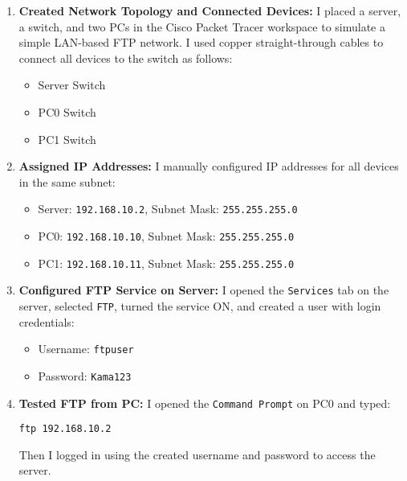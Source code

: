 \documentclass[11pt,a4paper]{article}
\let\oldincludegraphics\includegraphics
\renewcommand{\includegraphics}[2][]{%
  \begin{center}
    \oldincludegraphics[#1]{#2}
  \end{center}
}
\begin{document}
\begin{enumerate}
\item \textbf{Created Network Topology and Connected Devices:} I placed a server, a switch, and two PCs in the Cisco Packet Tracer workspace to simulate a simple LAN-based FTP network. I used copper straight-through cables to connect all devices to the switch as follows:
\begin{itemize}
  \item Server \textrightarrow{} Switch 
  \item PC0 \textrightarrow{} Switch  
  \item PC1 \textrightarrow{} Switch
\end{itemize}


\item \textbf{Assigned IP Addresses:} I manually configured IP addresses for all devices in the same subnet:
\begin{itemize}
  \item Server: \texttt{192.168.10.2}, Subnet Mask: \texttt{255.255.255.0}
  \item PC0: \texttt{192.168.10.10}, Subnet Mask: \texttt{255.255.255.0}
  \item PC1: \texttt{192.168.10.11}, Subnet Mask: \texttt{255.255.255.0}
\end{itemize}


\item \textbf{Configured FTP Service on Server:} I opened the \texttt{Services} tab on the server, selected \texttt{FTP}, turned the service ON, and created a user with login credentials:
\begin{itemize}
  \item Username: \texttt{ftpuser}
  \item Password: \texttt{Kama123}
\end{itemize}


\item \textbf{Tested FTP from PC:} I opened the \texttt{Command Prompt} on PC0 and typed:
\begin{verbatim}
ftp 192.168.10.2
\end{verbatim}
Then I logged in using the created username and password to access the server.


\end{enumerate}
\end{document}
